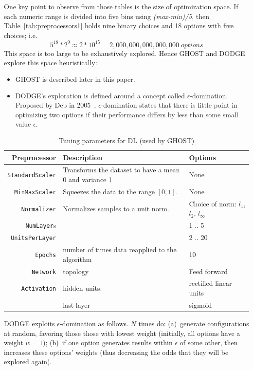 \documentclass[10pt,compsoc,twocolumn]{IEEEtran}
\newcommand{\bi}{\begin{itemize}}
\newcommand{\ei}{\end{itemize}}
\begin{document}
One key point to observe from those tables is the size of optimization space. If each numeric range is divided into five bins using {\em (max-min)/5}, then Table~\ref{tab:preprocessors1} holds nine binary choices and 18 options with five choices; i.e. \[5^{18}*2^9 \approx 2*10^{15} = 2,000,000,000,000,000\;\mathit{options}\]
This space is too large to be exhaustively explored. Hence
GHOST   and 
DODGE \cite{agrawal2019dodge} explore this space heuristically:
\bi
\item
GHOST is described later in this paper.
\item
DODGE's exploration is defined around
 a concept called $\epsilon$-domination.  Proposed by Deb in 2005~\cite{deb2005evaluating}, $\epsilon$-domination states that there is little point in optimizing two options if their performance differs by less than some small value $\epsilon$.
 \ei
 
\begin{table}[!b]
    \centering
    \scriptsize
    \caption{Tuning parameters for DL (used by GHOST)}
    \begin{tabularx}{\linewidth}{rp{2.5cm}L} 
        Preprocessor & Description & Options \\
        \midrule
         \texttt{StandardScaler} & Transforms the dataset to have a mean 0 and variance 1 & None \\
         \texttt{MinMaxScaler} & Squeezes the data to the range $[0,1]$. & None \\
        \texttt{Normalizer} & Normalizes samples to a unit norm. & Choice of norm: $l_1$, $l_2$,   $l_\infty$ \\
        
            \texttt{NumLayer}s & & 1 .. 5\\
       \texttt{UnitsPerLayer} & &  2 .. 20\\
        \texttt{Epochs} & number of times data reapplied to the algorithm & 10\\
      \texttt{Network} & topology & Feed forward\\
        \texttt{Activation} & hidden units: & rectified linear units  \\
                             & last layer & sigmoid\\
       
        
    \end{tabularx}
    \label{tab:preprocessors2}
\end{table}
DODGE  exploits   $\epsilon$-domination as follows. $N$ times do: (a)~generate configurations   at random, favoring those those with lowest weight (initially, all options have a weight $w=1$); (b)~if one option generates results within $\epsilon$ of some other, then   increases these options' weights (thus  decreasing the odds that they will be explored again).
\end{document}

